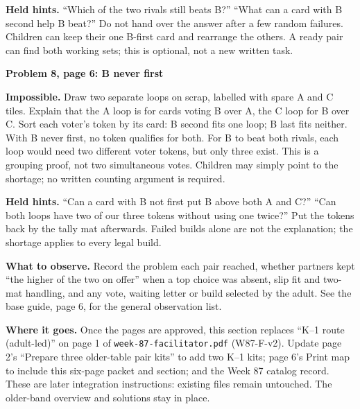 \documentclass[11pt]{article}
\newcommand{\sub}[1]{\par\textbf{#1}\par}
\begin{document}
\textbf{Held hints.} ``Which of the two rivals still beats B?'' ``What can a card with B second help B beat?'' Do not hand over the answer after a few random failures. Children can keep their one B-first card and rearrange the others. A ready pair can find both working sets; this is optional, not a new written task.

\sub{Problem 8, page 6: B never first}
\textbf{Impossible.} Draw two separate loops on scrap, labelled with spare A and C tiles. Explain that the A loop is for cards voting B over A, the C loop for B over C. Sort each voter's token by its card: B second fits one loop; B last fits neither. With B never first, no token qualifies for both. For B to beat both rivals, each loop would need two different voter tokens, but only three exist. This is a grouping proof, not two simultaneous votes. Children may simply point to the shortage; no written counting argument is required.

\textbf{Held hints.} ``Can a card with B not first put B above both A and C?'' ``Can both loops have two of our three tokens without using one twice?'' Put the tokens back by the tally mat afterwards. Failed builds alone are not the explanation; the shortage applies to every legal build.

\textbf{What to observe.} Record the problem each pair reached, whether partners kept ``the higher of the two on offer'' when a top choice was absent, slip fit and two-mat handling, and any vote, waiting letter or build selected by the adult. See the base guide, page 6, for the general observation list.

\textbf{Where it goes.} Once the pages are approved, this section replaces ``K--1 route (adult-led)'' on page 1 of \texttt{week-87-facilitator.pdf} (W87-F-v2). Update page 2's ``Prepare three older-table pair kits'' to add two K--1 kits; page 6's Print map to include this six-page packet and section; and the Week 87 catalog record. These are later integration instructions: existing files remain untouched. The older-band overview and solutions stay in place.
\end{document}
